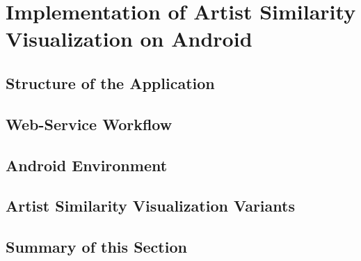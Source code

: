 \section{Implementation of Artist Similarity Visualization on Android}

\subsection{Structure of the Application}
\subsection{Web-Service Workflow}
\subsection{Android Environment}
\subsection{Artist Similarity Visualization Variants}

\subsection{Summary of this Section}